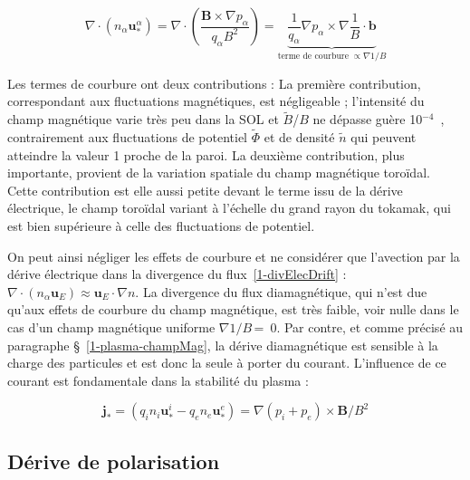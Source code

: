 \begin{refsection}
\begin{equation}
\nabla\cdot\left(n_\alpha\mathbf
u^\alpha_*\right)=\nabla\cdot\left(\frac{\mathbf B\times\nabla
p_\alpha}{q_\alpha B^2}\right)
=\underbrace{\frac{1}{q_\alpha}\nabla
p_\alpha\times\nabla\frac{1}{B}\cdot \mathbf b}_{\text{terme de
courbure}\;\propto\nabla 1/B}
\end{equation}

Les termes de courbure ont deux contributions : La première contribution,
correspondant aux fluctuations magnétiques, est négligeable ; l'intensité du
champ magnétique varie très peu dans la SOL et $\widetilde{B}$/$B$ ne dépasse guère
10$^{-4}$~\parencite{SarazinPhD}, contrairement aux fluctuations de potentiel $\widetilde{\Phi}$ et de densité $\widetilde{n}$
qui 
peuvent atteindre la valeur 1 proche de la paroi. La deuxième contribution,
plus importante, provient de la variation spatiale du champ magnétique toroïdal. Cette
contribution est elle aussi petite devant le terme issu de la dérive électrique,
le champ toroïdal variant à l'échelle du grand rayon du tokamak, qui est
bien supérieure à celle des fluctuations de potentiel.

On peut ainsi négliger les effets de courbure et ne considérer que l'avection par la dérive électrique dans la divergence du flux~\eqref{1-divElecDrift} :
$\nabla\cdot(n_\alpha\mathbf u_E)\approx \mathbf u_E\cdot\nabla n$. La divergence du flux diamagnétique, qui
n'est due qu'aux effets de courbure du champ magnétique, est très faible, voir
nulle dans le cas d'un champ magnétique uniforme $\nabla1/B\,$=~0.
Par contre, et comme précisé au paragraphe \S~\ref{1-plasma-champMag}, la dérive
diamagnétique est sensible à la charge des particules et est donc la seule à porter du courant.
L'influence de ce courant est fondamentale dans la stabilité du plasma :

\begin{equation}
\mathbf j_*=(q_in_i\mathbf u^i_*-q_en_e\mathbf
u^e_*)=\nabla(p_i+p_e)\times\mathbf B/B^2
\end{equation}



\subsection{Dérive de polarisation}


\end{refsection}
